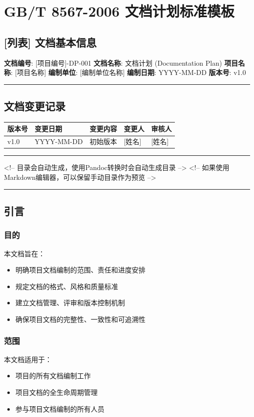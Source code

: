 \documentclass[12pt,a4paper]{article}
\numberwithin{equation}{section}  %
\begin{document}
\section{GB/T 8567-2006 文档计划标准模板}
\subsection{[列表] 文档基本信息}
\textbf{文档编号}: [项目编号]-DP-001  
\textbf{文档名称}: 文档计划 (Documentation Plan)  
\textbf{项目名称}: [项目名称]  
\textbf{编制单位}: [编制单位名称]  
\textbf{编制日期}: YYYY-MM-DD  
\textbf{版本号}: v1.0  

\hrule
\subsection{文档变更记录}
\begin{longtable}{|p{2.5cm}|p{3cm}|p{3cm}|p{3cm}|p{2.5cm}|}
\hline
版本号 & 变更日期 & 变更内容 & 变更人 & 审核人 \\
\hline
v1.0 & YYYY-MM-DD & 初始版本 & [姓名] & [姓名] \\
\hline
\end{longtable}

\hrule
<!-- 目录会自动生成，使用Pandoc转换时会自动生成目录 -->
<!-- 如果使用Markdown编辑器，可以保留手动目录作为预览 -->

\hrule
\subsection{引言}
\subsubsection{目的}
本文档旨在：
\begin{itemize}
\item 明确项目文档编制的范围、责任和进度安排
\item 规定文档的格式、风格和质量标准
\item 建立文档管理、评审和版本控制机制
\item 确保项目文档的完整性、一致性和可追溯性
\end{itemize}

\subsubsection{范围}
本文档适用于：
\begin{itemize}
\item [项目名称] 项目的所有文档编制工作
\item 项目文档的全生命周期管理
\item 参与项目文档编制的所有人员
\end{itemize}
\end{document}
